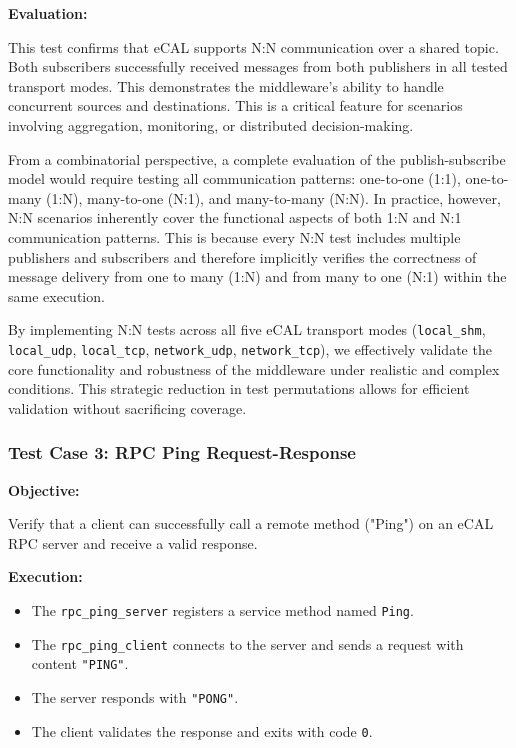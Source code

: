 \vspace{0.5em}
\textbf{Evaluation:}

\vspace{0.4em}
This test confirms that eCAL supports N:N communication over a shared topic. Both subscribers successfully received messages from both publishers in all tested transport modes. This demonstrates the middleware's ability to handle concurrent sources and destinations. This is a critical feature for scenarios involving aggregation, monitoring, or distributed decision-making.

\vspace{1em}
From a combinatorial perspective, a complete evaluation of the publish-subscribe model would require testing all communication patterns: one-to-one (1:1), one-to-many (1:N), many-to-one (N:1), and many-to-many (N:N). In practice, however, N:N scenarios inherently cover the functional aspects of both 1:N and N:1 communication patterns. This is because every N:N test includes multiple publishers and subscribers and therefore implicitly verifies the correctness of message delivery from one to many (1:N) and from many to one (N:1) within the same execution.

\vspace{1em}
By implementing N:N tests across all five eCAL transport modes (\texttt{local\_shm}, \texttt{local\_udp}, \texttt{local\_tcp}, \texttt{network\_udp}, \texttt{network\_tcp}), we effectively validate the core functionality and robustness of the middleware under realistic and complex conditions. This strategic reduction in test permutations allows for efficient validation without sacrificing coverage.

\newpage
\subsubsection{Test Case 3: RPC Ping Request-Response}
\label{sec:tc3}

\textbf{Objective:}

\vspace{0.4em}
Verify that a client can successfully call a remote method ("Ping") on an eCAL RPC server and receive a valid response.

\vspace{0.5em}
\textbf{Execution:}
\begin{itemize}
	\item The \texttt{rpc\_ping\_server} registers a service method named \texttt{Ping}.
	\item The \texttt{rpc\_ping\_client} connects to the server and sends a request with content \texttt{"PING"}.
	\item The server responds with \texttt{"PONG"}.
	\item The client validates the response and exits with code \texttt{0}.
\end{itemize}

